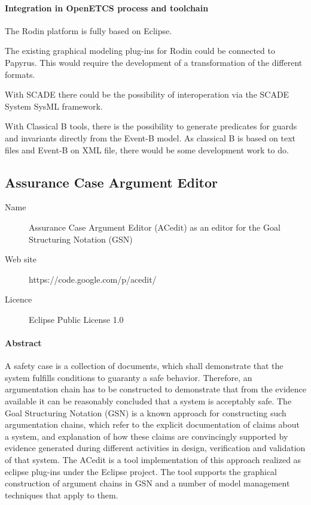 \paragraph{Integration in OpenETCS process and toolchain}

  The Rodin platform is fully based on Eclipse.

  The existing graphical modeling plug-ins for Rodin could be connected to
  Papyrus. This would require the development of a transformation of the
  different formats.

  With SCADE there could be the possibility of interoperation via the SCADE
  System SysML framework.

  With Classical B tools, there is the possibility to generate predicates for
  guards and invariants directly from the Event-B model. As classical B is based
  on text files and Event-B on XML file, there would be some development work to
  do.

\subsection{Assurance Case Argument Editor}
\label{sec:ACAE}

\begin{description}
\item[Name] Assurance Case Argument Editor (ACedit) as an editor for the Goal Structuring Notation (GSN)
\item[Web site] https://code.google.com/p/acedit/
\item[Licence] Eclipse Public License 1.0
\end{description}

\paragraph{Abstract}

A safety case is a collection of documents, which shall demonstrate that the system fulfills conditions to guaranty a safe behavior. Therefore, an argumentation chain has to be constructed to demonstrate that from the evidence available it can be reasonably concluded that a system is acceptably safe.  The Goal Structuring Notation (GSN) is a known  approach  for  constructing such argumentation chains, which refer to the explicit documentation of claims about a system,  and  explanation  of  how  these  claims  are  convincingly  supported  by evidence generated during different activities in design, verification and validation of that system.
The ACedit is a tool implementation of this approach realized as eclipse plug-ins under the Eclipse project. The tool supports the graphical construction of argument chains in GSN and a number of model management techniques that apply to them.

